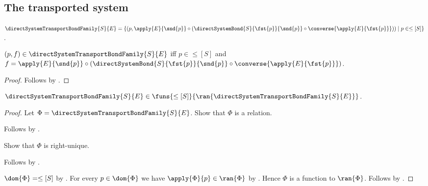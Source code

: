 \subsection{The transported system}

\begin{definition}\label{direct_system_transport_bond_family}
    $\directSystemTransportBondFamily{S}{E}=
        \{(p,
            \apply{E}{\snd{p}}\circ
                (\directSystemBond{S}{\fst{p}}{\snd{p}}\circ
                    \converse{\apply{E}{\fst{p}}}))
            \mid p\in\leq[S]\}$.
\end{definition}

\begin{proposition}\label{direct_system_transport_bond_family_iff}
    $(p,f)\in\directSystemTransportBondFamily{S}{E}$ iff
        $p\in\leq[S]$ and
        $f=\apply{E}{\snd{p}}\circ
            (\directSystemBond{S}{\fst{p}}{\snd{p}}\circ
                \converse{\apply{E}{\fst{p}}})$.
\end{proposition}
\begin{proof}
    Follows by
        .
\end{proof}

\begin{proposition}\label{direct_system_transport_bond_family_type}
    $\directSystemTransportBondFamily{S}{E}\in
        \funs{\leq[S]}{\ran{\directSystemTransportBondFamily{S}{E}}}$.
\end{proposition}
\begin{proof}
    Let $\Phi=\directSystemTransportBondFamily{S}{E}$.
    Show that $\Phi$ is a relation.
    \begin{subproof}
        Follows by
            .
    \end{subproof}
    Show that $\Phi$ is right-unique.
    \begin{subproof}
        Follows by
            .
    \end{subproof}
    $\dom{\Phi}=\leq[S]$ by
        .
    For every $p\in\dom{\Phi}$ we have
        $\apply{\Phi}{p}\in\ran{\Phi}$ by
        .
    Hence $\Phi$ is a function to $\ran{\Phi}$.
    Follows by .
\end{proof}

